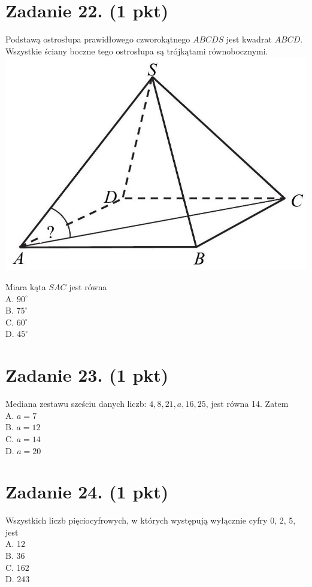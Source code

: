 \documentclass[10pt]{article}
\begin{document}
\section*{Zadanie 22. (1 pkt)}
Podstawą ostrosłupa prawidłowego czworokątnego \(A B C D S\) jest kwadrat \(A B C D\). Wszystkie ściany boczne tego ostrosłupa są trójkątami równobocznymi.\\
\includegraphics[max width=\textwidth, center]{2024_11_21_d51d653f4fe4a5bb0c33g-12}

Miara kąta \(S A C\) jest równa\\
A. \(90^{\circ}\)\\
B. \(75^{\circ}\)\\
C. \(60^{\circ}\)\\
D. \(45^{\circ}\)

\section*{Zadanie 23. (1 pkt)}
Mediana zestawu sześciu danych liczb: \(4,8,21, a, 16,25\), jest równa 14. Zatem\\
A. \(a=7\)\\
B. \(a=12\)\\
C. \(a=14\)\\
D. \(a=20\)

\section*{Zadanie 24. (1 pkt)}
Wszystkich liczb pięciocyfrowych, w których występują wyłącznie cyfry 0, 2, 5, jest\\
A. 12\\
B. 36\\
C. 162\\
D. 243
\end{document}
